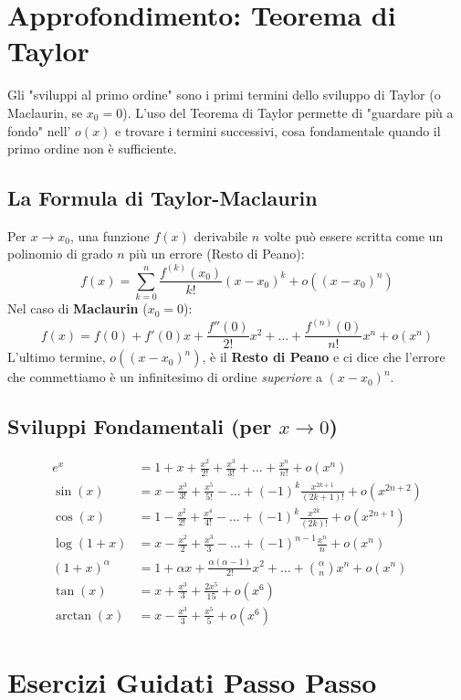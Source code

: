 \newpage
\section{Approfondimento: Teorema di Taylor}

Gli "sviluppi al primo ordine" sono i primi termini dello sviluppo di Taylor (o Maclaurin, se $x_0 = 0$). L'uso del Teorema di Taylor permette di "guardare più a fondo" nell' $o(x)$ e trovare i termini successivi, cosa fondamentale quando il primo ordine non è sufficiente.

\subsection{La Formula di Taylor-Maclaurin}
Per $x \to x_0$, una funzione $f(x)$ derivabile $n$ volte può essere scritta come un polinomio di grado $n$ più un errore (Resto di Peano):
$$ f(x) = \sum_{k=0}^{n} \frac{f^{(k)}(x_0)}{k!}(x-x_0)^k + o((x-x_0)^n) $$
Nel caso di \textbf{Maclaurin} ($x_0=0$):
$$ f(x) = f(0) + f'(0)x + \frac{f''(0)}{2!}x^2 + \dots + \frac{f^{(n)}(0)}{n!}x^n + o(x^n) $$
L'ultimo termine, $o((x-x_0)^n)$, è il \textbf{Resto di Peano} e ci dice che l'errore che commettiamo è un infinitesimo di ordine \textit{superiore} a $(x-x_0)^n$.

\subsection{Sviluppi Fondamentali (per $x \to 0$)}
\begin{align*}
    e^x &= 1 + x + \frac{x^2}{2!} + \frac{x^3}{3!} + \dots + \frac{x^n}{n!} + o(x^n) \\
    \sin(x) &= x - \frac{x^3}{3!} + \frac{x^5}{5!} - \dots + (-1)^k \frac{x^{2k+1}}{(2k+1)!} + o(x^{2n+2}) \\
    \cos(x) &= 1 - \frac{x^2}{2!} + \frac{x^4}{4!} - \dots + (-1)^k \frac{x^{2k}}{(2k)!} + o(x^{2n+1}) \\
    \log(1+x) &= x - \frac{x^2}{2} + \frac{x^3}{3} - \dots + (-1)^{n-1} \frac{x^n}{n} + o(x^n) \\
    (1+x)^\alpha &= 1 + \alpha x + \frac{\alpha(\alpha-1)}{2!}x^2 + \dots + \binom{\alpha}{n}x^n + o(x^n) \\
    \tan(x) &= x + \frac{x^3}{3} + \frac{2x^5}{15} + o(x^6) \\
    \arctan(x) &= x - \frac{x^3}{3} + \frac{x^5}{5} + o(x^6)
\end{align*}

\newpage
\section{Esercizi Guidati Passo Passo}


